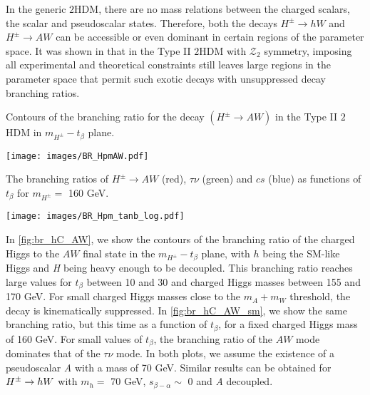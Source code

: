In the generic $2$HDM, there are no mass relations between the charged scalars, the scalar and pseudoscalar states. Therefore, both the decays $H^{\pm} \rightarrow h W$ and $H^{\pm} \rightarrow A W$ can be accessible or even dominant in certain regions of the parameter space. It was shown in \cite{Coleppa:2013dya} that in the Type II $2$HDM with $\mathcal{Z}_2$ symmetry, imposing all experimental and theoretical constraints still leaves large regions in the parameter space that permit such exotic decays with unsuppressed decay branching ratios. 
\begin{marginfigure}[-12cm]
    \caption{Contours of the branching ratio for the decay $( H^{\pm} \rightarrow AW)$ in the Type II $2$HDM in $m_{H^\pm}-t_{\beta}$ plane.}
 	\texttt{[image: images/BR\_HpmAW.pdf]}
    \label{fig:br_hC_AW}
\end{marginfigure}
\begin{marginfigure}[-1.5cm]
    \caption{The branching ratios of $H^{\pm} \rightarrow AW$ (red), $\tau\nu$ (green) and $cs$ (blue) as functions of $t_{\beta}$ for $m_{H^\pm} =$ 160 GeV.}
 	\texttt{[image: images/BR\_Hpm\_tanb\_log.pdf]}
\label{fig:br_hC_AW_sm}
\end{marginfigure}

In \autoref{fig:br_hC_AW}, we show the contours of the branching ratio of the charged Higgs to the $AW$ final state in the $m_{H^{\pm}}-t_{\beta}$ plane, with $h$ being the SM-like Higgs and \emph{H} being heavy enough to be decoupled. This branching ratio reaches large values for $t_{\beta}$ between 10 and 30 and charged Higgs masses between 155 and 170 GeV. For small charged Higgs masses close to the $m_A + m_W$ threshold, the decay is kinematically suppressed. In \autoref{fig:br_hC_AW_sm}, we show the same branching ratio, but this time as a function of $t_\beta$, for a fixed charged Higgs mass of 160 GeV. For small values of $t_{\beta}$, the branching ratio of the $AW$ mode dominates that of the $\tau\nu$ mode. In both plots, we assume the existence of a pseudoscalar \emph{A} with a mass of 70 GeV. Similar results can be obtained for $H^{\pm} \rightarrow h W$ with $m_{h} =$ 70 GeV,  $s_{\beta-\alpha}\sim$ 0 and \emph{A} decoupled. 


